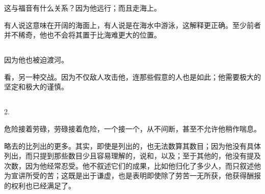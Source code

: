 \par

这与福音有什么关系？因为他远行；而且走海上。\par

 有人说这意味在开阔的海面上，有人说是在海水中游泳，这解释更正确。至少前者并不稀奇，他也不会将其置于比海难更大的位置。\par


\subsection{}

\par

因为他也被迫渡河。 \par

\par

看，另一种交战。因为不仅敌人攻击他，连那些假意的人也是如此；他需要极大的坚定和极大的谨慎。\par


\subsection{}

2. \par

危险接着劳碌，劳碌接着危险，一个接一个，从不间断，甚至不允许他稍作喘息。\par

\par

略去的比列出的更多。其实，即使是列出的，也无法数算其数目；因为他没有具体列出，而只提到那些数目少且容易理解的，说和，以及；至于其他的，他没有提及次数，因为他经常忍受。他不叙述它们的成果，比如他归化了多少人，而只叙述他为宣讲所受的苦；这既是出于谦虚，也是表明即使除了劳苦一无所获，他获得酬报的权利也已经满足了。\par

